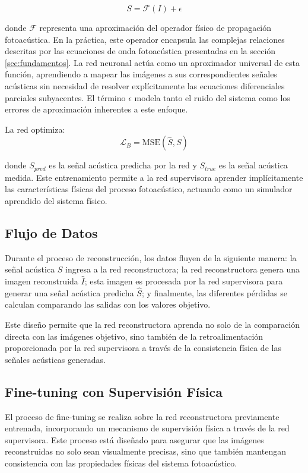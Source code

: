 \begin{equation}
    S = \mathcal{F}(I) + \epsilon
\end{equation}

donde $\mathcal{F}$ representa una aproximación del operador físico de propagación fotoacústica. En la práctica, este operador encapsula las complejas relaciones descritas por las ecuaciones de onda fotoacústica presentadas en la sección \ref{sec:fundamentos}. La red neuronal actúa como un aproximador universal de esta función, aprendiendo a mapear las imágenes a sus correspondientes señales acústicas sin necesidad de resolver explícitamente las ecuaciones diferenciales parciales subyacentes. El término $\epsilon$ modela tanto el ruido del sistema como los errores de aproximación inherentes a este enfoque.

La red optimiza:
\begin{equation}
    \mathcal{L}_B = \text{MSE}(\hat{S}, S)
\end{equation}

donde $S_{pred}$ es la señal acústica predicha por la red y $S_{true}$ es la señal acústica medida. Este entrenamiento permite a la red supervisora aprender implícitamente las características físicas del proceso fotoacústico, actuando como un simulador aprendido del sistema físico.

\subsection{Flujo de Datos}

Durante el proceso de reconstrucción, los datos fluyen de la siguiente manera: la señal acústica $S$ ingresa a la red reconstructora; la red reconstructora genera una imagen reconstruida $\hat{I}$; esta imagen es procesada por la red supervisora para generar una señal acústica predicha $\hat{S}$; y finalmente, las diferentes pérdidas se calculan comparando las salidas con los valores objetivo.

Este diseño permite que la red reconstructora aprenda no solo de la comparación directa con las imágenes objetivo, sino también de la retroalimentación proporcionada por la red supervisora a través de la consistencia física de las señales acústicas generadas.

\subsection{Fine-tuning con Supervisión Física}

El proceso de fine-tuning se realiza sobre la red reconstructora previamente entrenada, incorporando un mecanismo de supervisión física a través de la red supervisora. Este proceso está diseñado para asegurar que las imágenes reconstruidas no solo sean visualmente precisas, sino que también mantengan consistencia con las propiedades físicas del sistema fotoacústico.

